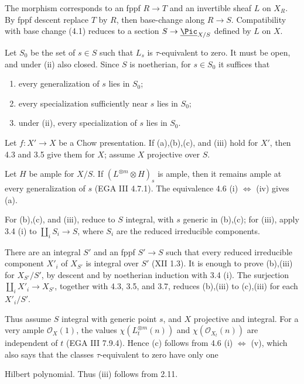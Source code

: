 The morphism corresponds to an fppf \(R\to T\) and an invertible sheaf
\(L\) on \(X_R\). By fppf descent replace \(T\) by \(R\), then base-change
along \(R\to S\). Compatibility with base change (4.1) reduces to a
section \(S\to\underline{\Pic}_{X/S}\) defined by \(L\) on \(X\).

Let \(S_0\) be the set of \(s\in S\) such that \(L_s\) is
\(\tau\)-equivalent to zero. It must be open, and under (ii) also closed.
Since \(S\) is noetherian, for \(s\in S_0\) it suffices that
\begin{enumerate}[label=(\alph*)]
\item every generalization of \(s\) lies in \(S_0\);
\item every specialization sufficiently near \(s\) lies in \(S_0\);
\item under (ii), every specialization of \(s\) lies in \(S_0\).
\end{enumerate}

Let \(f:X'\to X\) be a Chow presentation. If (a),(b),(c), and (iii) hold
for \(X'\), then 4.3 and 3.5 give them for \(X\); assume \(X\) projective
over \(S\).

Let \(H\) be ample for \(X/S\). If
\((L^{\otimes m}\otimes H)_s\) is ample, then it remains ample at every
generalization of \(s\) (EGA III 4.7.1). The equivalence 4.6
(i) \(\Longleftrightarrow\) (iv) gives (a).

For (b),(c), and (iii), reduce to \(S\) integral, with \(s\) generic in
(b),(c); for (iii), apply 3.4 (i) to
\(\coprod_iS_i\to S\), where \(S_i\) are the reduced irreducible
components.

There are an integral \(S'\) and an fppf \(S'\to S\) such that every
reduced irreducible component \(X'_i\) of \(X_{S'}\) is integral over
\(S'\) (XII 1.3). It is enough to prove (b),(iii) for \(X_{S'}/S'\), by
descent and by noetherian induction with 3.4 (i). The surjection
\(\coprod_iX'_i\to X_{S'}\), together with 4.3, 3.5, and 3.7, reduces
(b),(iii) to (c),(iii) for each \(X'_i/S'\).

Thus assume \(S\) integral with generic point \(s\), and \(X\) projective
and integral. For a very ample \(\mathcal O_X(1)\), the values
\(\chi(L_t^{\otimes m}(n))\) and \(\chi(\mathcal O_{X_t}(n))\) are
independent of \(t\) (EGA III 7.9.4). Hence (c) follows from 4.6
(i) \(\Longleftrightarrow\) (v), which also says that the classes
\(\tau\)-equivalent to zero have only one

Hilbert polynomial. Thus (iii) follows from 2.11.

